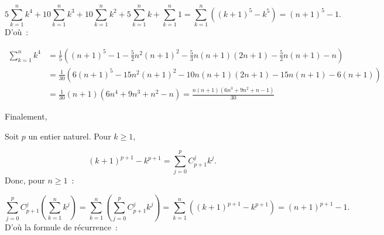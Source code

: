 {\begin{enumerate}
{$$5\sum_{k=1}^{n}k^4+10\sum_{k=1}^{n}k^3+10\sum_{k=1}^{n}k^2+5\sum_{k=1}^{n}k+\sum_{k=1}^{n}1=\sum_{k=1}^{n}((k+1)^5-k^5)
=(n+1)^5-1.$$
D'où~:

\begin{align*}
\sum_{k=1}^{n}k^4&=\frac{1}{5}((n+1)^5-1-\frac{5}{2}n^2(n+1)^2-\frac{5}{3}n(n+1)(2n+1)-\frac{5}{2}n(n+1)-n)\\
 &=\frac{1}{30}(6(n+1)^5-15n^2(n+1)^2-10n(n+1)(2n+1)-15n(n+1)-6(n+1))\\
 &=\frac{1}{30}(n+1)(6n^4+9n^3+n^2-n)=\frac{n(n+1)(6n^3+9n^2+n-1)}{30}
\end{align*}

Finalement,
\begin{center}
\end{center}
Soit $p$ un entier naturel. Pour $k\geq1$,

$$(k+1)^{p+1}-k^{p+1}=\sum_{j=0}^{p}C_{p+1}^jk^j.$$
Donc, pour $n\geq1$~:

$$\sum_{j=0}^{p}C_{p+1}^j(\sum_{k=1}^{n}k^j)=\sum_{k=1}^{n}(\sum_{j=0}^{p}C_{p+1}^jk^j)=\sum_{k=1}^{n}((k+1)^{p+1}-k^{p+1})=(
n+1)^{p+1}-1.$$
D'où la formule de récurrence~:

\begin{center}
\end{center}
}
\end{enumerate}
}
